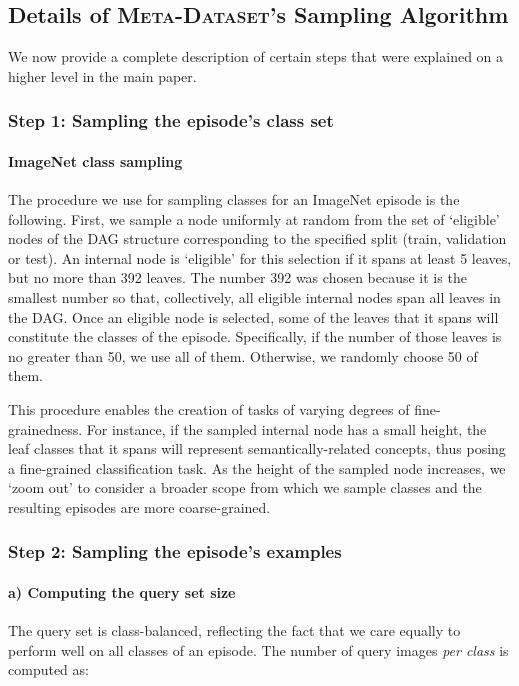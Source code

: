 \documentclass{article} \usepackage{iclr2020_conference,times}
\newcommand{\benchmark}{\textsc{Meta-Dataset}\xspace}
\begin{document}
\subsection{Details of \benchmark's Sampling Algorithm}
We now provide a complete description of certain steps that were explained on a higher level in the main paper.
\subsubsection*{Step 1: Sampling the episode's class set}
\paragraph{ImageNet class sampling} The procedure we use for sampling classes for an ImageNet
episode is the following. First, we sample a node uniformly at random
from the set of `eligible' nodes of the DAG structure corresponding to the
specified split (train, validation or test). An internal node is `eligible' for
this selection if it spans at least 5 leaves, but no more than 392 leaves.  The
number 392 was chosen because it is the smallest number so that, collectively,
all eligible internal nodes span all leaves in the DAG. Once an eligible node is 
selected, some of the leaves that it spans will constitute the classes of the episode. Specifically, if the number of those leaves is no greater than 50, we use all of them. Otherwise, we randomly choose 50 of them.

This procedure enables the creation of tasks of varying degrees of
fine-grainedness. For instance, if the sampled internal node has a small
height, the leaf classes that it spans will represent semantically-related
concepts, thus posing a fine-grained classification task. As the height of the
sampled node increases, we `zoom out' to consider a broader scope from which we
sample classes and the resulting episodes are more coarse-grained.

\subsubsection*{Step 2: Sampling the episode's examples}
\paragraph{a) Computing the query set size} The query set is class-balanced, reflecting the fact that we care equally to
perform well on all classes of an episode. The number of query images
\textit{per class} is computed as:
\end{document}
